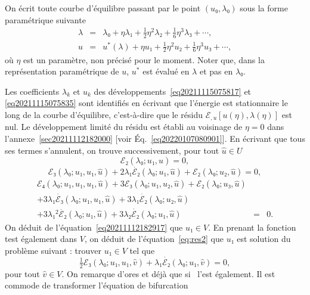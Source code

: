 \documentclass[12pt, final]{amsart}
\theoremstyle{definition}
\begin{document}
On écrit toute courbe d'équilibre passant par le point $(u₀,
λ₀)$ sous la forme paramétrique suivante
\begin{eqnarray}
  λ & = & λ₀ + η λ₁ + \tfrac{1}{2} η^2 λ₂ +
  \tfrac{1}{6} η^3 λ₃ + \cdots,  \label{eq20211115075817}\\
  u & = & u^{\ast} (λ) + η u₁ + \tfrac{1}{2} η^2 u₂ +
  \tfrac{1}{6} η^3 u₃ + \cdots,  \label{eq20211115075835}
\end{eqnarray}
où $η$ est un paramètre, non précisé pour le moment. Noter
que, dans la représentation paramétrique de $u$, $u^{\ast}$ est
évalué en $λ$ et pas en $λ₀$.

Les coefficients $λ_k$ et $u_k$ des
développements~\eqref{eq20211115075817} et \eqref{eq20211115075835} sont
identifiés en écrivant que l'énergie est stationnaire le long de
la courbe d'équilibre, c'est-à-dire que le résidu $ℰ_{,
u}  [u (η), λ (η)]$ est nul. Le développement limité du
résidu est établi au voisinage de $η = 0$ dans
l'annexe~\ref{sec20211112182000} [voir Éq.~\eqref{eq20220107080901}]. En
écrivant que tous ses termes s'annulent, on trouve successivement, pour
tout $\hat{u}∈U$
\begin{equation}
  \label{eq20211112182917} ℰ₂ (λ₀ ; u₁, \hat{u}) = 0,
\end{equation}
\begin{equation}
  \label{eq:res2} ℰ₃ (λ₀ ; u₁, u₁, \hat{u}) + 2 λ₁
  \dot{ℰ₂} (λ₀ ; u₁, \hat{u}) +ℰ₂ (λ₀ ;
  u₂, \hat{u}) = 0,
\end{equation}
\begin{eqnarray}
  ℰ₄ (λ₀ ; u₁, u₁, u₁, \hat{u}) + 3ℰ₃
  (λ₀ ; u₁, u₂, \hat{u}) +ℰ₂ (λ₀ ; u₃, \hat{u}) &
  &  \nonumber\\
  + 3 λ₁  \dot{ℰ₃} (λ₀ ; u₁, u₁, \hat{u}) + 3
  λ₁  \dot{ℰ₂} (λ₀ ; u₂, \hat{u}) &  &  \nonumber\\
  + 3 λ₁^2  \ddot{ℰ₂} (λ₀ ; u₁, \hat{u}) + 3
  λ₂  \dot{ℰ₂} (λ₀ ; u₁, \hat{u}) & = & 0.
  \label{eq:res3}
\end{eqnarray}
On déduit de l'équation~\eqref{eq20211112182917} que $u₁∈V$. En
prenant la fonction test également dans $V$, on déduit de
l'équation~\eqref{eq:res2} que $u₁$ est solution du problème suivant
: trouver $u₁∈V$ tel que
\begin{equation}
  \label{eq:bifurcation 1a} \tfrac{1}{2} ℰ₃ (λ₀ ; u₁, u₁,
  \hat{v}) + λ₁  \dot{ℰ₂} (λ₀ ; u₁, \hat{v}) = 0,
\end{equation}
pour tout $\hat{v}∈V$. On remarque d'ores et déjà que si \ l'est
également. Il est commode de transformer l'équation de bifurcation
\end{document}

